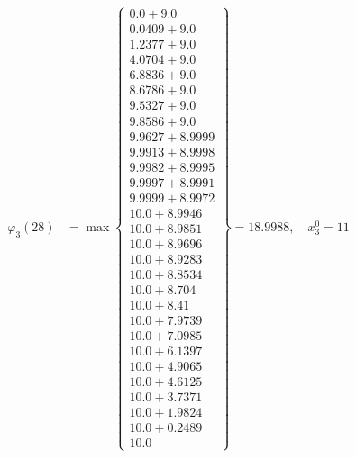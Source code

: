 \documentclass{article}
\begin{document}
\begin{align*}
  
\varphi_{3}(28) &= \max \left\{ \begin{array}{c}
0.0 + 9.0 \\
 0.0409 + 9.0 \\
 1.2377 + 9.0 \\
 4.0704 + 9.0 \\
 6.8836 + 9.0 \\
 8.6786 + 9.0 \\
 9.5327 + 9.0 \\
 9.8586 + 9.0 \\
 9.9627 + 8.9999 \\
 9.9913 + 8.9998 \\
 9.9982 + 8.9995 \\
 9.9997 + 8.9991 \\
 9.9999 + 8.9972 \\
 10.0 + 8.9946 \\
 10.0 + 8.9851 \\
 10.0 + 8.9696 \\
 10.0 + 8.9283 \\
 10.0 + 8.8534 \\
 10.0 + 8.704 \\
 10.0 + 8.41 \\
 10.0 + 7.9739 \\
 10.0 + 7.0985 \\
 10.0 + 6.1397 \\
 10.0 + 4.9065 \\
 10.0 + 4.6125 \\
 10.0 + 3.7371 \\
 10.0 + 1.9824 \\
 10.0 + 0.2489 \\
 10.0
\end{array} \right\}=18.9988,\quad x_{3}^0=11\\
  
  
  

\end{align*}
\end{document}
